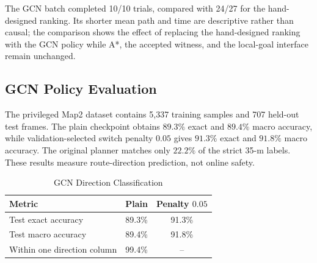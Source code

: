 \documentclass[letterpaper,10pt,conference]{ieeeconf}
\newcommand{\blank}{--}
\begin{document}
\begin{table}[t]
\caption{Frontier-Policy Ablation Within ScaleNav}
\label{tab:single_run_validation}
\centering
\small
{}
\end{table}

The GCN batch completed 10/10 trials, compared with 24/27 for the hand-designed
ranking.  Its shorter mean path and time are descriptive rather than causal;
the comparison shows the effect of replacing the hand-designed ranking with
the GCN policy while A*, the accepted witness, and the local-goal interface
remain unchanged.

\subsection{GCN Policy Evaluation}
\label{sec:heuristic_eval}
The privileged Map2 dataset contains 5,337 training samples and 707 held-out
test frames.  The plain checkpoint obtains $89.3\%$ exact and $89.4\%$ macro
accuracy, while validation-selected switch penalty $0.05$ gives $91.3\%$ exact
and $91.8\%$ macro accuracy.  The original planner matches only $22.2\%$ of
the strict 35-m labels.  These results measure route-direction prediction,
not online safety.

\begin{table}[t]
\caption{GCN Direction Classification}
\label{tab:gcn_offline}
\centering
\small
\begin{tabular}{lcc}
\toprule
Metric & Plain & Penalty $0.05$ \\
\midrule
Test exact accuracy & 89.3\% & 91.3\% \\
Test macro accuracy & 89.4\% & 91.8\% \\
Within one direction column & 99.4\% & \blank \\
\bottomrule
\end{tabular}
\end{table}
\end{document}
